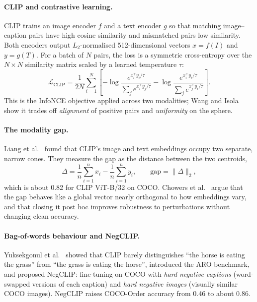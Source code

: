 \documentclass[11pt,a4paper]{article}
\newcommand{\gapv}{\Delta}
\begin{document}
\paragraph{CLIP and contrastive learning.}
CLIP \cite{clip} trains an image encoder $f$ and a text encoder $g$ so that matching image--caption
pairs have high cosine similarity and mismatched pairs low similarity. Both encoders output
$L_2$-normalised 512-dimensional vectors $x=f(I)$ and $y=g(T)$. For a batch of $N$ pairs, the loss is
a symmetric cross-entropy over the $N\times N$ similarity matrix scaled by a learned temperature $\tau$:
\begin{equation}
\mathcal{L}_{\text{CLIP}}=\frac{1}{2N}\sum_{i=1}^{N}\left[-\log\frac{e^{x_i^\top y_i/\tau}}{\sum_j e^{x_i^\top y_j/\tau}}
-\log\frac{e^{x_i^\top y_i/\tau}}{\sum_j e^{x_j^\top y_i/\tau}}\right].
\end{equation}
This is the InfoNCE objective \cite{infonce} applied across two modalities; Wang and Isola \cite{wangisola}
show it trades off \emph{alignment} of positive pairs and \emph{uniformity} on the sphere.

\paragraph{The modality gap.}
Liang et al.\ \cite{liang} found that CLIP's image and text embeddings occupy two separate, narrow cones.
They measure the gap as the distance between the two centroids,
\begin{equation}
\gapv=\frac{1}{n}\sum_{i=1}^{n}x_i-\frac{1}{n}\sum_{i=1}^{n}y_i,\qquad \text{gap}=\lVert\gapv\rVert_2 ,
\end{equation}
which is about 0.82 for CLIP ViT-B/32 on COCO. Chowers et al.\ \cite{chowers} argue that the gap behaves
like a global vector nearly orthogonal to how embeddings vary, and that closing it post hoc improves
robustness to perturbations without changing clean accuracy.

\paragraph{Bag-of-words behaviour and NegCLIP.}
Yuksekgonul et al.\ \cite{aro} showed that CLIP barely distinguishes ``the horse is eating the grass''
from ``the grass is eating the horse'', introduced the ARO benchmark, and proposed NegCLIP: fine-tuning
on COCO with \emph{hard negative captions} (word-swapped versions of each caption) and \emph{hard negative
images} (visually similar COCO images). NegCLIP raises COCO-Order accuracy from 0.46 to about 0.86.
\end{document}
